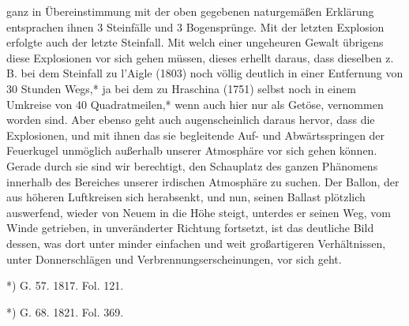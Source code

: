 \documentclass[a4paper, 11pt, oneside, polutonikogreek, german]{article}
\begin{document}
ganz in Übereinstimmung mit der oben gegebenen naturgemäßen Erklärung entsprachen ihnen 3 Steinfälle und 3 Bogensprünge. Mit der letzten Explosion erfolgte auch der letzte Steinfall. Mit welch einer ungeheuren Gewalt übrigens diese Explosionen vor sich gehen müssen, dieses erhellt daraus, dass dieselben z. B. bei dem Steinfall zu l'Aigle (1803) noch völlig deutlich in einer Entfernung von 30 Stunden Wegs,* ja bei dem zu Hraschina (1751) selbst noch in einem Umkreise von 40 Quadratmeilen,* wenn auch hier nur als Getöse, vernommen worden sind. Aber ebenso geht auch augenscheinlich daraus hervor, dass die Explosionen, und mit ihnen das sie begleitende Auf- und Abwärtsspringen der Feuerkugel unmöglich außerhalb unserer Atmosphäre vor sich gehen können. Gerade durch sie sind wir berechtigt, den Schauplatz des ganzen Phänomens innerhalb des Bereiches unserer irdischen Atmosphäre zu suchen. Der Ballon, der aus höheren Luftkreisen sich herabsenkt, und nun, seinen Ballast plötzlich auswerfend, wieder von Neuem in die Höhe steigt, unterdes er seinen Weg, vom Winde getrieben, in unveränderter Richtung fortsetzt, ist das deutliche Bild dessen, was dort unter minder einfachen und weit großartigeren Verhältnissen, unter Donnerschlägen und Verbrennungserscheinungen, vor sich geht.

*) G. 57. 1817. Fol. 121.

*) G. 68. 1821. Fol. 369.
\end{document}
